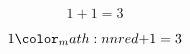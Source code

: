 \documentclass{article}
\begin{document}
\ExplSyntaxOn
\[ 1 + 1 = 3\]

\[1 \color_math:nn {red}{+} 1 = 3 \]
\ExplSyntaxOn
\end{document}

